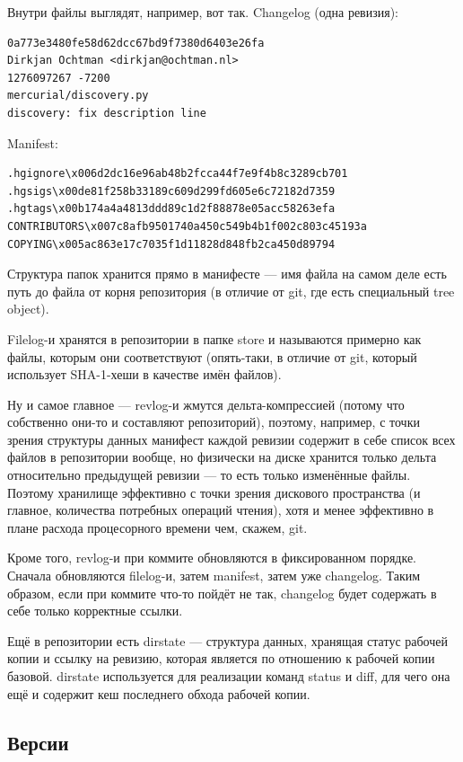 \documentclass[a5paper]{article}
\begin{document}
Внутри файлы выглядят, например, вот так. Changelog (одна ревизия):

\begin{verbatim}
0a773e3480fe58d62dcc67bd9f7380d6403e26fa
Dirkjan Ochtman <dirkjan@ochtman.nl>
1276097267 -7200
mercurial/discovery.py
discovery: fix description line
\end{verbatim}

Manifest:
\begin{verbatim}
.hgignore\x006d2dc16e96ab48b2fcca44f7e9f4b8c3289cb701
.hgsigs\x00de81f258b33189c609d299fd605e6c72182d7359
.hgtags\x00b174a4a4813ddd89c1d2f88878e05acc58263efa
CONTRIBUTORS\x007c8afb9501740a450c549b4b1f002c803c45193a
COPYING\x005ac863e17c7035f1d11828d848fb2ca450d89794
\end{verbatim}

Структура папок хранится прямо в манифесте --- имя файла на самом деле есть путь до файла от корня репозитория (в отличие от git, где есть специальный tree object).

Filelog-и хранятся в репозитории в папке store и называются примерно как файлы, которым они соответствуют (опять-таки, в отличие от git, который использует SHA-1-хеши в качестве имён файлов).

Ну и самое главное --- revlog-и жмутся дельта-компрессией (потому что собственно они-то и составляют репозиторий), поэтому, например, с точки зрения структуры данных манифест каждой ревизии содержит в себе список всех файлов в репозитории вообще, но физически на диске хранится только дельта относительно предыдущей ревизии --- то есть только изменённые файлы. Поэтому хранилище эффективно с точки зрения дискового пространства (и главное, количества потребных операций чтения), хотя и менее эффективно в плане расхода процесорного времени чем, скажем, git.

Кроме того, revlog-и при коммите обновляются в фиксированном порядке. Сначала обновляются filelog-и, затем manifest, затем уже changelog. Таким образом, если при коммите что-то пойдёт не так, changelog будет содержать в себе только корректные ссылки.

Ещё в репозитории есть dirstate --- структура данных, хранящая статус рабочей копии и ссылку на ревизию, которая является по отношению к рабочей копии базовой. dirstate используется для реализации команд status и diff, для чего она ещё и содержит кеш последнего обхода рабочей копии.

\subsection{Версии}
\end{document}
